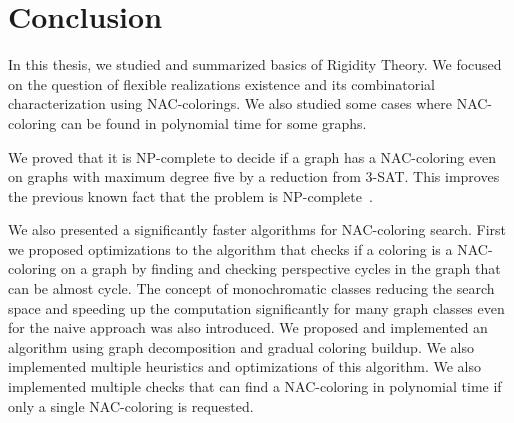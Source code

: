 
\chapter*{Conclusion}



In this thesis,
we studied and summarized basics of Rigidity Theory.
We focused on the question of flexible realizations existence
and its combinatorial characterization using NAC-colorings.
We also studied some cases where NAC-coloring can be found in polynomial time
for some graphs.

We proved that it is NP-complete
to decide if a graph has a NAC-coloring even on graphs with maximum degree five
by a reduction from 3-SAT\@.
This improves the previous known fact that the problem is NP-complete~\cite{np_complete}.

We also presented a significantly faster algorithms
for NAC-coloring search.
%
First we proposed optimizations to the algorithm
that checks if a coloring is a NAC-coloring on a graph
by finding and checking perspective cycles in the graph
that can be almost cycle.
%
The concept of monochromatic classes reducing the search space
and speeding up the computation significantly for many graph classes
even for the naive approach was also introduced.
%
We proposed and implemented an algorithm using graph decomposition and gradual coloring buildup.
We also implemented multiple heuristics and optimizations of this algorithm.
%
We also implemented multiple checks that can find a NAC-coloring in polynomial time
if only a single NAC-coloring is requested.


